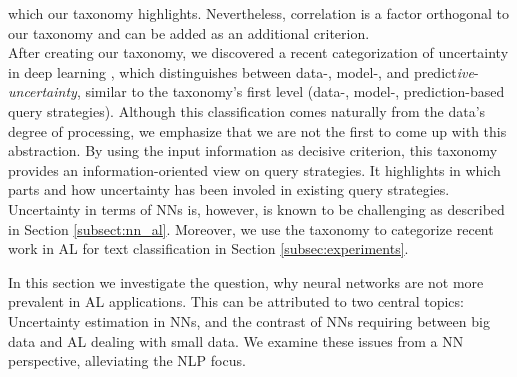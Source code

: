 which our taxonomy highlights.
Nevertheless, correlation is a factor orthogonal to our taxonomy and can be added as an additional criterion.
\\
\pindent After creating our taxonomy, we discovered a recent categorization of uncertainty in deep learning , which distinguishes between data-, model-, and predict{\em{}ive}-{\em uncertainty}, similar to the taxonomy's first level (data-, model-, prediction-based query strategies).
Although this classification comes naturally from the data's degree of processing, we emphasize that we are not the first to come up with this abstraction.
By using the input information as decisive criterion, this taxonomy provides an information-oriented view on query strategies.
It highlights in which parts and how uncertainty has been involed in existing query strategies. Uncertainty in terms of NNs is, however, is known to be challenging as described in Section \ref{subsect:nn_al}. Moreover, we use the taxonomy to categorize recent work in AL for text classification in Section \ref{subsec:experiments}.

\label{subsect:nn_al}
In this section we investigate the question, why neural networks are not more prevalent in AL applications. 
This can be attributed to two central topics: Uncertainty estimation in NNs, and the contrast of NNs requiring between big data and AL dealing with small data.
We examine these issues from a NN perspective, alleviating the NLP focus.

